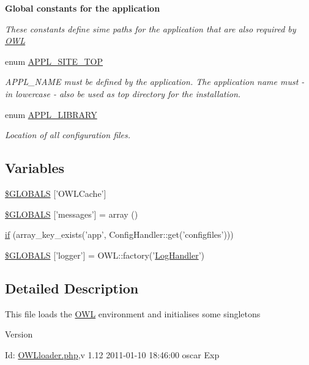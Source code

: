 \begin{Indent}{\bf Global constants for the application}\par
{\em \label{_amgrp3ebb069601fef11bcb0ba759cb17b4d6}
 These constants define sime paths for the application that are also required by \hyperlink{classOWL}{OWL} }\begin{DoxyCompactItemize}
\item 
enum \hyperlink{OWLloader_8php_a17a0c6fb6eda7d05081d16bc519c97b5}{APPL\_\-SITE\_\-TOP} 
\begin{DoxyCompactList}\small\item\em APPL\_\-NAME must be defined by the application. The application name must -\/ in lowercase -\/ also be used as top directory for the installation. \item\end{DoxyCompactList}\item 
enum \hyperlink{OWLloader_8php_a1b19bb6ffba1d1e7871092e086cc4e94}{APPL\_\-LIBRARY} 
\begin{DoxyCompactList}\small\item\em Location of all configuration files. \item\end{DoxyCompactList}\end{DoxyCompactItemize}
\end{Indent}
\subsection*{Variables}
\begin{DoxyCompactItemize}
\item 
\hyperlink{OWLloader_8php_a79190ec221c2b52403f7324f1d224c8f}{\$GLOBALS} \mbox{[}'OWLCache'\mbox{]}
\item 
\hyperlink{OWLloader_8php_a65f2996116eed36e9ab25f254a470259}{\$GLOBALS} \mbox{[}'messages'\mbox{]} = array ()
\item 
\hyperlink{OWLloader_8php_a78407183564d6b92f2219d8a10b9349c}{if} (array\_\-key\_\-exists('app', ConfigHandler::get('configfiles')))
\item 
\hyperlink{OWLloader_8php_ad8f7743ae327face727dae55887c2a43}{\$GLOBALS} \mbox{[}'logger'\mbox{]} = OWL::factory('\hyperlink{classLogHandler}{LogHandler}')
\end{DoxyCompactItemize}


\subsection{Detailed Description}
This file loads the \hyperlink{classOWL}{OWL} environment and initialises some singletons \begin{DoxyVersion}{Version}

\end{DoxyVersion}
\begin{DoxyParagraph}{Id:}
\hyperlink{OWLloader_8php}{OWLloader.php},v 1.12 2011-\/01-\/10 18:46:00 oscar Exp 
\end{DoxyParagraph}


